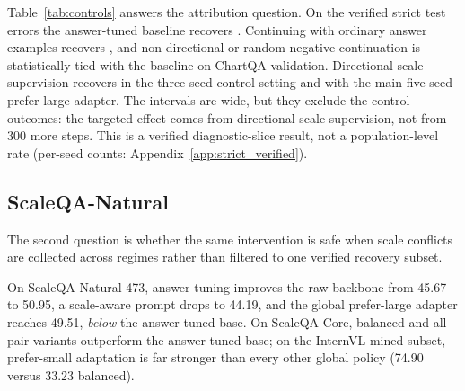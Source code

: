 \begin{table}[t]
\centering
\small
\resizebox{\linewidth}{!}{}
\caption{Compute-matched controls. Every row continues the same answer-tuned adapter for the same number of steps; only the continuation data differs. Recovery is reported as counts over the  blind-verified strict test errors with Wilson 95\% intervals.}
\label{tab:controls}
\end{table}

Table~\ref{tab:controls} answers the attribution question. On the verified strict test errors the answer-tuned baseline recovers . Continuing with ordinary answer examples recovers , and non-directional or random-negative continuation is statistically tied with the baseline on ChartQA validation. Directional scale supervision recovers  in the three-seed control setting and  with the main five-seed prefer-large adapter. The intervals are wide, but they exclude the control outcomes: the targeted effect comes from directional scale supervision, not from 300 more steps. This is a verified diagnostic-slice result, not a population-level rate (per-seed counts: Appendix~\ref{app:strict_verified}).

\subsection{ScaleQA-Natural}
\label{sec:scaleqa_results}

The second question is whether the same intervention is safe when scale conflicts are collected across regimes rather than filtered to one verified recovery subset.

\begin{table}[t]
\centering
\small
\resizebox{\textwidth}{!}{}
\caption{ScaleQA-Natural diagnostic results. The first row is the image-evaluable ScaleQA-Natural-473 subset; ScaleQA-Core and InternVL-mined report five-seed pair-mode means. Large/Small denote prefer-large/prefer-small adapters.}
\label{tab:scaleqa_results}
\end{table}

On ScaleQA-Natural-473, answer tuning improves the raw backbone from 45.67 to 50.95, a scale-aware prompt drops to 44.19, and the global prefer-large adapter reaches 49.51, \emph{below} the answer-tuned base. On ScaleQA-Core, balanced and all-pair variants outperform the answer-tuned base; on the InternVL-mined subset, prefer-small adaptation is far stronger than every other global policy (74.90 versus 33.23 balanced).

